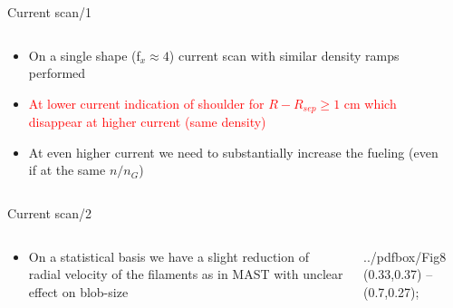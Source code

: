 \documentclass[10pt, compress]{beamer}
\begin{document}
\begin{frame}{Current scan/1}
  \begin{columns}
    \begin{column}{0.5\textwidth}
      \begin{itemize}
      \item<1-3> On a single shape (f$_x \approx 4$) current scan with
        similar density ramps performed
      \item<2-3> \textcolor{red}{At lower current indication of shoulder for $R-R_{sep}
        \geq 1$ cm which disappear at higher current (same density)}
      \item<3> \textcolor{ta3chameleon}{At even higher current we need to substantially
        increase the fueling (even if at the same $n/n_G$)}
      \end{itemize}
    \end{column}
    \begin{column}{0.5\textwidth}
    \end{column}
  \end{columns}
\end{frame}

\begin{frame}{Current scan/2}
  \begin{columns}
    \begin{column}{0.5\textwidth}
      \begin{itemize}
      \item On a statistical basis we have a slight
        reduction of radial velocity of the filaments as in MAST \parencite{Kirk:2016jj} with unclear
        effect on blob-size
      \end{itemize}
    \end{column}
      \begin{column}{0.5\textwidth}
     \begin{tikzonimage}[width=\textwidth]{../pdfbox/Fig8}
        (0.33,0.37) -- (0.7,0.27);
     \end{tikzonimage}
   \end{column}
  \end{columns}
  \end{frame}
\end{document}

